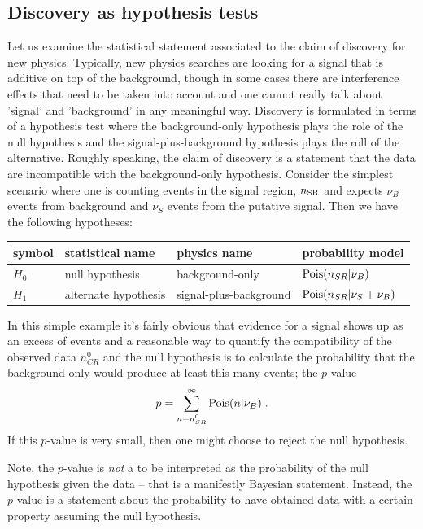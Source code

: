 \documentclass{cernrep}
\newcommand{\Pois}{{\ensuremath{\rm Pois}}}
\begin{document}
\subsection{Discovery as hypothesis tests}\label{S:hypothesis test}

Let us examine the statistical statement associated to the claim of discovery for new physics.  Typically, new physics searches are looking for a signal that is additive on top of the background, though in some cases there are interference effects that need to be taken into account and one cannot really talk about 'signal' and 'background' in any meaningful way.  Discovery is formulated in terms of a hypothesis test where the background-only hypothesis plays the role of the null hypothesis and the signal-plus-background hypothesis plays the roll of the alternative.  Roughly speaking, the claim of discovery is a statement that the data are incompatible with the background-only hypothesis.  Consider the simplest scenario where one is counting events in the signal region, $n_{\rm SR}$ and expects $\nu_B$ events from background and $\nu_S$ events from the putative signal.    Then we have the following hypotheses:
\begin{center}
\begin{tabular}{llll}
symbol & statistical name & physics name & probability model \\ \hline
$H_0$ &  null hypothesis & background-only & $\Pois(n_{SR} | \nu_B)$ \\
$H_1$ &  alternate hypothesis & signal-plus-background & $\Pois(n_{SR} | \nu_S+\nu_B)$ 
\end{tabular}
\end{center}
In this simple example it's fairly obvious that evidence for a signal shows up as an excess of events and a reasonable way to quantify the compatibility of the observed data $n_{CR}^0$ and the null hypothesis is to calculate the probability that the background-only would produce at least this many events; the $p$-value
\begin{equation}
p = \sum_{n=n_{SR}^0}^\infty \Pois(n | \nu_B) \; .
\end{equation}
If this $p$-value is very small, then one might choose to reject the null hypothesis.

Note, the $p$-value is \textit{not} a to be interpreted as the probability of the null hypothesis given the data -- that is a manifestly Bayesian statement.  Instead, the $p$-value is a statement about the probability to have obtained data with a certain property assuming the null hypothesis.
\end{document}
